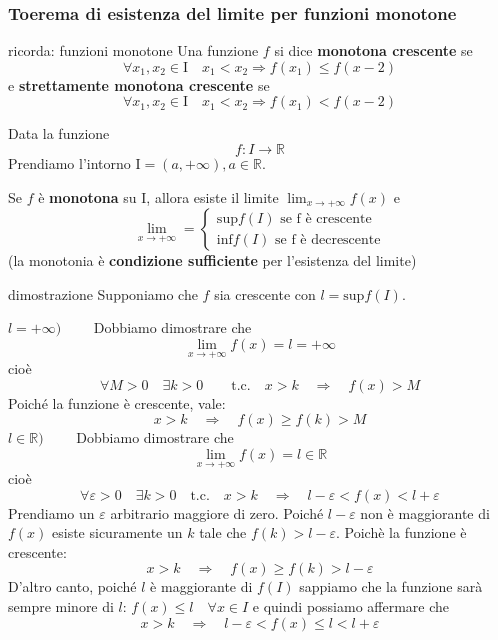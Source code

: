 \documentclass[x11names]{article}
\begin{document}
	\begin{center}
		\colorbox{myred}{\begin{minipage}{5.75in}
				\begin{redes}{}
					\subsubsection{Toerema di esistenza del limite per funzioni monotone}
					\begin{redes}{ricorda: funzioni monotone}
						Una funzione $f$ si dice \textbf{monotona crescente} se
						\[
						\forall x_1, x_2 \in \text{I} \quad x_1 < x_2 \Longrightarrow f(x_1) \leq f(x-2) 
						\]
						e \textbf{strettamente monotona crescente} se
						\[
						\forall x_1, x_2 \in \text{I} \quad x_1 < x_2 \Longrightarrow f(x_1) < f(x-2) 
						\]
					\end{redes}
					Data la funzione
					\[
					f: I \rightarrow \mathbb{R}
					\]
					Prendiamo l'intorno $\text{I} = (a,+\infty), a \in \mathbb{R}$.
					
					Se $f$ è \textbf{monotona} su $\text{I}$, allora esiste il limite $\lim_{x \to +\infty}f(x)$ e 
					\[
					\lim_{x \to +\infty} = 
					\begin{cases}
						\text{sup}f(I) \text{ se f è crescente}  \\
						\text{inf}f(I) \text{ se f è decrescente} 
					\end{cases}
					\]
					(la monotonia è \textbf{condizione sufficiente} per l'esistenza del limite)
				\end{redes}
		\end{minipage}}        
	\end{center}
	
	\begin{es}{dimostrazione}
		Supponiamo che $f$ sia crescente con $l = \text{sup}f(I)$.
		
		$l = + \infty\text{)} \qquad$ Dobbiamo dimostrare che
		\[
		\lim_{x \to + \infty}f(x) = l = + \infty
		\]
		cioè
		\[
		\forall M > 0 \quad \exists k > 0  \qquad \text{t.c.} \quad x > k  \quad \Longrightarrow \quad f(x) > M
		\]
		Poiché la funzione è crescente, vale:
		\[
		x > k \quad \Longrightarrow \quad f(x) \geq f(k) > M
		\]
		$l \in \mathbb{R} \text{)} \qquad$ Dobbiamo dimostrare che 
		\[
		\lim_{x \to + \infty}f(x) = l \in \mathbb{R}
		\]
		cioè
		\[
		\forall \varepsilon > 0 \quad \exists k > 0 \quad \text{t.c.} \quad x>k \quad \Longrightarrow \quad l -\varepsilon < f(x) < l + \varepsilon
		\]
		Prendiamo un $\varepsilon$ arbitrario maggiore di zero. Poiché $l-\varepsilon$ non è maggiorante di $f(x)$ esiste sicuramente un $k$ tale che $f(k) > l - \varepsilon$. Poichè la funzione è crescente:
		\[
		x > k \quad \Longrightarrow \quad f(x) \geq f(k) > l - \varepsilon
		\]
		D'altro canto, poiché $l$ è maggiorante di $f(I)$ sappiamo che la funzione sarà sempre minore di $l$: $f(x) \leq l \quad \forall x \in I$ e quindi possiamo affermare che
		\[
		x > k \quad \Longrightarrow \quad l - \varepsilon < f(x) \leq l < l + \varepsilon
		\]
	\end{es}
	
\end{document}
